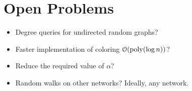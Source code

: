 \section{Open Problems}%
\label{sec:open_problems}
\begin{itemize}
    \item Degree queries for undirected random graphs?
    \item Faster implementation of coloring $\mathcal O(\mathrm{poly}(\log n))$?
    \item Reduce the required value of $\alpha$?
    \item Random walks on other networks? Ideally, any network.
\end{itemize}

